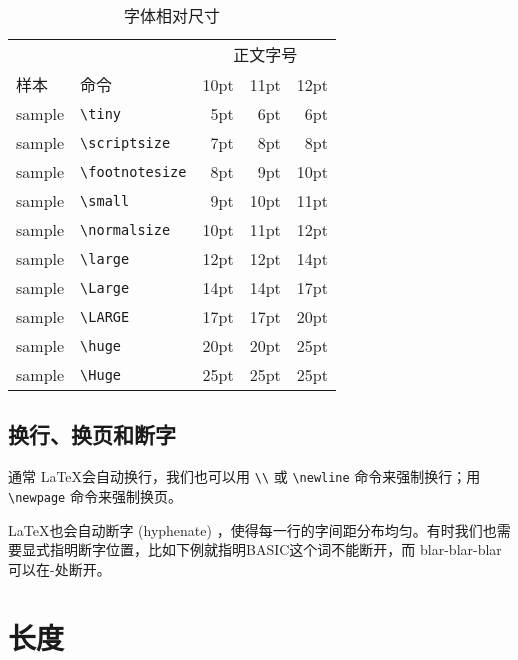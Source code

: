 \begin{table}[htbp]
\centering
\caption{字体相对尺寸}
\label{tab:fontsize}
\begin{tabular}{llrrr}
    \toprule
    & & \multicolumn{3}{c}{正文字号} \\
    \cmidrule(lr){3-5}
    样本 & 命令 & 10pt & 11pt & 12pt \\
    \midrule
    \tiny{sample} & \verb|\tiny|         & 5pt  & 6pt  & 6pt \\
    \scriptsize{sample} & \verb|\scriptsize|   & 7pt  & 8pt  & 8pt \\
    \footnotesize{sample} & \verb|\footnotesize| & 8pt  & 9pt  & 10pt \\
    \small{sample} & \verb|\small|        & 9pt  & 10pt & 11pt \\
    \normalsize{sample} & \verb|\normalsize|   & 10pt & 11pt & 12pt \\
    \large{sample} & \verb|\large|        & 12pt & 12pt & 14pt \\
    \Large{sample} & \verb|\Large|        & 14pt & 14pt & 17pt \\
    \LARGE{sample} & \verb|\LARGE|        & 17pt & 17pt & 20pt \\
    \huge{sample} & \verb|\huge|         & 20pt & 20pt & 25pt \\
    \Huge{sample} & \verb|\Huge|         & 25pt & 25pt & 25pt \\
    \bottomrule
\end{tabular}
\end{table}

\subsection{换行、换页和断字}

通常 \LaTeX 会自动换行，我们也可以用 \verb|\\| 或 \verb|\newline| 命令来强制换行；用 \verb|\newpage| 命令来强制换页。

\LaTeX 也会自动断字 (hyphenate) ，使得每一行的字间距分布均匀。有时我们也需要显式指明断字位置，比如下例就指明BASIC这个词不能断开，而 blar-blar-blar 可以在-处断开。

\begin{Code}[]
\end{Code}

\section{长度}
\label{sec:length}

